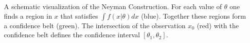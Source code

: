 A schematic visualization of the Neyman Construction.  For each value of $\theta$ one finds a region in $x$ that satisfies $\int f(x|\theta) dx$ (blue).  Together these regions form a confidence belt (green).  The intersection of the observation $x_0$ (red) with the confidence belt defines the confidence interval $[\theta_1,\theta_2]$.